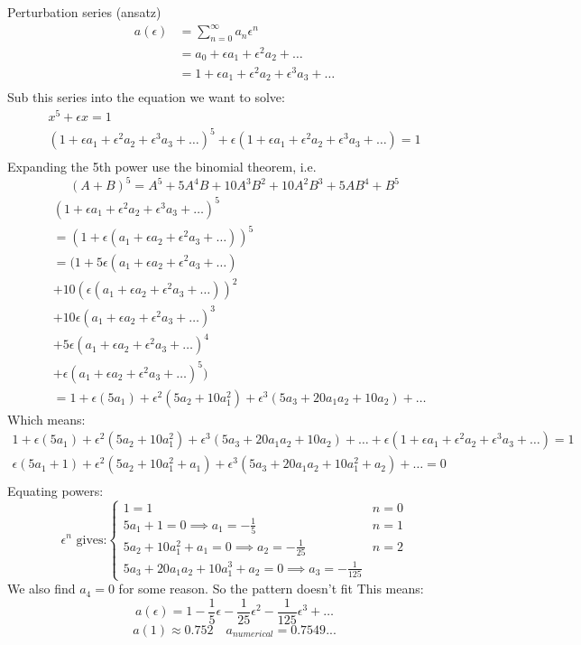 \documentclass{X:/Documents/Coding/Latex/myassignment}
\begin{document}
Perturbation series (ansatz)
\begin{align*}
    a(\epsilon) &= \sum_{n=0}^\infty a_n \epsilon^n\\
    &= a_0 + \epsilon a_1 + \epsilon^2 a_2 + \hdots\\
    &= 1 + \epsilon a_1 + \epsilon^2 a_2 + \epsilon^3a_3 + \hdots\\
\end{align*}
Sub this series into the equation we want to solve:
\begin{align*}
    x^5 + \epsilon x =1\\
    \left(1 + \epsilon a_1 + \epsilon^2 a_2 + \epsilon^3 a_3 + \hdots \right)^5  + \epsilon\left(1 + \epsilon a_1 + \epsilon^2 a_2 + \epsilon^3 a_3 + \hdots \right) = 1\\
\end{align*}
Expanding the 5th power use the binomial theorem, i.e.
\[(A+B)^5 = A^5 + 5A^4B + 10A^3B^2 + 10A^2B^3 + 5AB^4 +  B^5\]
\begin{align*}
    &\left(1 + \epsilon a_1 + \epsilon^2 a_2 + \epsilon^3 a_3 + \hdots \right)^5\\
    &= \left(1 + \epsilon (a_1 + \epsilon a_2 + \epsilon^2 a_3 + \hdots) \right)^5\\
    &=(1 + 5\epsilon (a_1 + \epsilon a_2 + \epsilon^2 a_3 + \hdots)\\
    &+ 10 (\epsilon (a_1 + \epsilon a_2 + \epsilon^2 a_3 + \hdots))^2\\
    &+ 10\epsilon (a_1 + \epsilon a_2 + \epsilon^2 a_3 + \hdots)^3 \\
    &+ 5\epsilon (a_1 + \epsilon a_2 + \epsilon^2 a_3 + \hdots)^4\\
    &+ \epsilon (a_1 + \epsilon a_2 + \epsilon^2 a_3 + \hdots)^5)\\
    &= 1 + \epsilon(5a_1) + \epsilon^2 (5a_2 + 10a_1^2) + \epsilon^3(5a_3 + 20a_1a_2 + 10a_2) + \hdots
\end{align*}
Which means:
\begin{align*}
    1 + \epsilon(5a_1) + \epsilon^2 (5a_2 + 10a_1^2) + \epsilon^3(5a_3 + 20a_1a_2 + 10a_2) + \hdots + \epsilon(1+\epsilon a_1 + \epsilon^2 a_2 + \epsilon^3 a_3 + \hdots) = 1\\
    \epsilon(5a_1 +1) + \epsilon^2 (5a_2 + 10a_1^2 + a_1) + \epsilon^3(5a_3 + 20a_1a_2 + 10a_1^2 + a_2) + \hdots =0\\
\end{align*}
Equating powers:
\[\epsilon^n \text{ gives:} \begin{cases}
1=1&n=0\\
5a_1 +1 =0 \implies a_1 = -\frac15 & n=1\\
5a_2 + 10a_1^2 + a_1 = 0 \implies a_2 = -\frac1{25} & n=2\\
5a_3 + 20a_1a_2 + 10a_1^3 + a_2 = 0 \implies a_3 = -\frac{1}{125}
\end{cases}\]
We also find $a_4 = 0$ for some reason. So the pattern doesn't fit
This means:
\[a(\epsilon) = 1 - \frac15 \epsilon - \frac1{25} \epsilon^2 - \frac1{125} \epsilon^3 + \hdots\]
\[a(1) \approx 0.752 \quad a_{numerical} = 0.7549...\]
\end{document}
